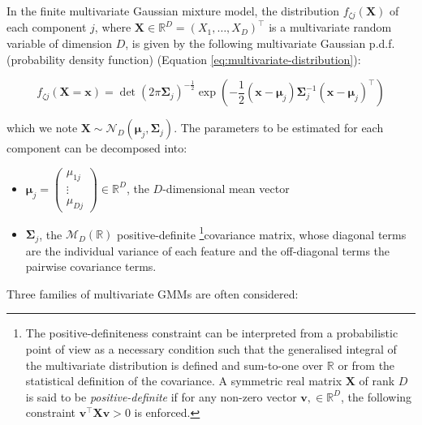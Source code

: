 In the finite multivariate Gaussian mixture model, the distribution \(f_{\zeta j}(\boldsymbol{X})\) of each component \(j\), where
\(\boldsymbol{X} \in \mathbb{R}^D =(X_1, \ldots, X_D)^\top\) is a multivariate random variable
of dimension \(D\), is given by the
following multivariate Gaussian p.d.f. (probability density function)
(Equation \eqref{eq:multivariate-distribution}):

\begin{equation}
    f_{\zeta j}(\boldsymbol{X}=\boldsymbol{x})=\operatorname{det}(2\pi\boldsymbol{\Sigma}_j)^{-\frac{1}{2}} \exp\left( -\frac{1}{2} (\boldsymbol{x} - \boldsymbol{\mu}_j) \boldsymbol{\Sigma}_j^{-1} (\boldsymbol{x} - \boldsymbol{\mu}_j)^\top\right)
\label{eq:multivariate-distribution}
\end{equation}

which we note
\(\boldsymbol{X} \sim \mathcal{N}_D(\boldsymbol{\mu}_j, \boldsymbol{\Sigma}_j)\). The parameters to be estimated for each component can be decomposed into:

\begin{itemize}
\item
  \(\boldsymbol{\mu}_j=\begin{pmatrix} \mu_{1j} \\ \vdots \\ \mu_{Dj} \end{pmatrix} \in \mathbb{R}^D\), the \(D\)-dimensional mean vector
\item
  \(\boldsymbol{\Sigma}_j\), the \(\mathcal{M}_D(\mathbb{R})\) positive-definite \footnote{The positive-definiteness constraint can be interpreted from a probabilistic point of view as a necessary condition such that the generalised integral of the multivariate distribution is defined and sum-to-one over \(\mathbb{R}\) or from the statistical definition of the covariance. A symmetric real matrix \(\boldsymbol{X}\) of rank \(D\) is said to be \textit{positive-definite} if for any non-zero vector
    \(\mathbf{v}, \in \mathbb{R}^D\), the following constraint
    \(\mathbf{v}^\top \boldsymbol{X} \mathbf{v} > 0\) is enforced.}covariance matrix, whose diagonal terms are the individual variance of each feature and the off-diagonal terms the pairwise covariance terms.
\end{itemize}

Three families of multivariate GMMs are often considered:

